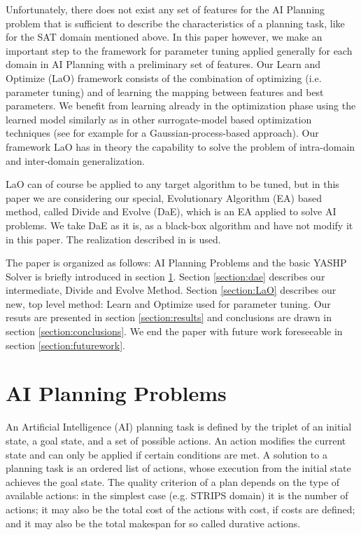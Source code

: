 \documentclass{acm_proc_article-sp}
\begin{document}
Unfortunately, there does not exist any set of features for the AI Planning problem that is sufficient to describe the characteristics of a planning task, like for the SAT domain \cite{Hutter06} mentioned above. In this paper however, we make an important step to the framework for parameter tuning applied generally for each domain in AI Planning with a preliminary set of features. Our Learn and Optimize (LaO) framework consists of the combination of optimizing (i.e. parameter tuning) and of learning the mapping between features and best parameters. We benefit from learning already in the optimization phase using the learned model similarly as in other surrogate-model based optimization techniques (see for example \cite{Bardenet} for a Gaussian-process-based approach). Our framework LaO has in theory the capability to solve the problem of intra-domain and inter-domain generalization.

LaO can of course be applied to any target algorithm to be tuned, but in this paper we are considering our special, Evolutionary Algorithm (EA) based method, called Divide and Evolve (DaE), which is an EA applied to solve AI problems. We take DaE as it is, as a black-box algorithm and have not modify it in this paper. The realization described in \cite{BibEvoCop:2010} is used. 

The paper is organized as follows: AI Planning Problems and the basic YASHP Solver is briefly introduced in section \ref{section:planning}. Section \ref{section:dae} describes our intermediate, Divide and Evolve Method. Section \ref{section:LaO} describes our new, top level method: Learn and Optimize used for parameter tuning. Our resuts are presented in section \ref{section:results} and conclusions are drawn in section \ref{section:conclusions}. We end the paper with future work foreseeable in section \ref{section:futurework}.

\section{AI Planning Problems}
\label{section:planning}

An Artificial Intelligence (AI) planning task is defined by the triplet of an initial state, a goal state, and a set of possible actions. An action modifies the current state and can only be applied if certain conditions are met. A solution to a planning task is an ordered list of actions, whose execution from the initial state achieves the goal state. The quality criterion of a plan depends on the type of available actions: in the simplest case (e.g. STRIPS domain) it is the number of actions; it may also be the total cost of the actions with cost, if costs are defined; and it may also be the total makespan for so called durative actions.
\end{document}
